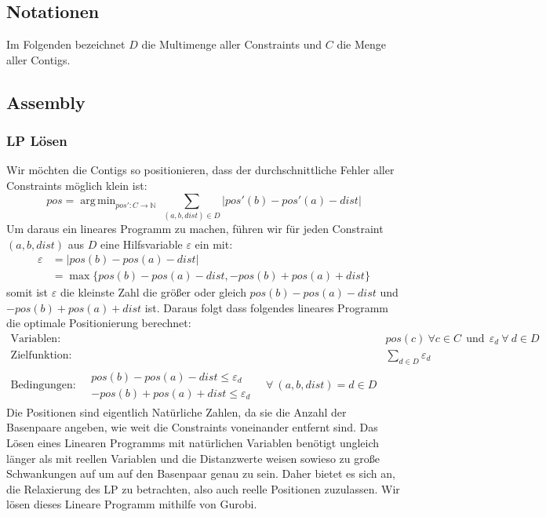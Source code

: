 \documentclass[12pt,ngerman,titlepage,a4paper]{article}
\DeclareMathOperator*{\argmin}{arg\,min}
\begin{document}
\subsection{Notationen}
Im Folgenden bezeichnet $D$ die Multimenge aller Constraints und $C$ die Menge aller Contigs.
\subsection{Assembly}
\subsubsection*{LP Lösen} Wir möchten die Contigs so positionieren, dass der durchschnittliche Fehler aller Constraints möglich klein ist:
\[ pos = \argmin_{pos': C \rightarrow \mathbb{N}} \ \sum_{(a,b,dist) \in D} |pos'(b) - pos'(a) - dist| \]
Um daraus ein lineares Programm zu machen, führen wir für jeden Constraint $(a,b,dist)$ aus $D$ eine Hilfsvariable $\varepsilon$ ein mit:
\begin{align*}
 \varepsilon &= |pos(b) - pos(a) - dist|\\
  &= \max \{pos(b) - pos(a) - dist, -pos(b) + pos(a) + dist \} 
\end{align*}
somit ist $\varepsilon$ die kleinste Zahl die größer oder gleich $pos(b) - pos(a) - dist$ und $-pos(b) + pos(a) + dist$ ist. Daraus folgt dass folgendes lineares Programm die optimale Positionierung berechnet:
\begin{align*}
	\text{Variablen:}\quad& pos(c) \ \forall c \in C \ \ \text{und} \ \ \varepsilon_{d}  \ \forall \ d \in D\\
	\text{Zielfunktion:}\quad& \sum_{d \in D} \varepsilon_{d}\\
	\text{Bedingungen:}\quad \begin{split} pos(b) - pos(a) - dist \leq \varepsilon_{d}\\
	                                      -pos(b) + pos(a) + dist \leq \varepsilon_{d} \end{split}\quad \forall \ (a,b,dist) = d \in D
\end{align*}
Die Positionen sind eigentlich Natürliche Zahlen, da sie die Anzahl der Basenpaare angeben, wie weit die Constraints voneinander entfernt sind. Das Lösen eines Linearen Programms mit natürlichen Variablen benötigt ungleich länger als mit reellen Variablen und die Distanzwerte weisen sowieso zu große Schwankungen auf um auf den Basenpaar genau zu sein. Daher bietet es sich an, die Relaxierung des LP zu betrachten, also auch reelle Positionen zuzulassen.
Wir lösen dieses Lineare Programm mithilfe von Gurobi.
\end{document}
